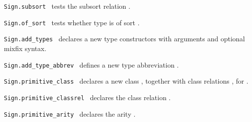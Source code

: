 \begin{isabellebody}
\begin{isamarkuptext}
\begin{description}
  \item \verb|Sign.subsort|~
  tests the subsort relation .

  \item \verb|Sign.of_sort|~ tests whether type
  \isa{{\isasymtau}} is of sort .

  \item \verb|Sign.add_types|~ declares a new
  type constructors \isa{{\isasymkappa}} with  arguments and
  optional mixfix syntax.

  \item \verb|Sign.add_type_abbrev|~\isa{{\isacharparenleft}{\isasymkappa}{\isacharcomma}\ \isactrlvec {\isasymalpha}{\isacharcomma}\ {\isasymtau}{\isacharparenright}} defines a new type abbreviation \isa{{\isacharparenleft}\isactrlvec {\isasymalpha}{\isacharparenright}{\isasymkappa}\ {\isacharequal}\ {\isasymtau}}.

  \item \verb|Sign.primitive_class|~ declares a new class , together with class
  relations , for .

  \item \verb|Sign.primitive_classrel|~ declares the class relation .

  \item \verb|Sign.primitive_arity|~ declares
  the arity .


\end{description}
\end{isamarkuptext}
\end{isabellebody}

